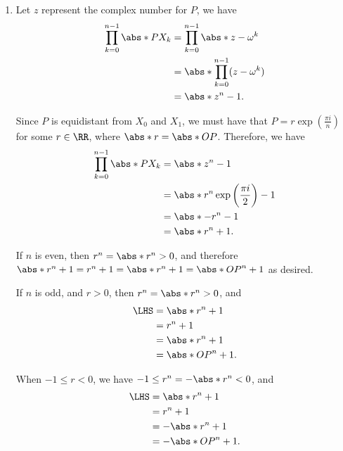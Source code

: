 \begin{enumerate}
    \item Let \(z\) represent the complex number for \(P\), we have
          \begin{align*}
              \prod_{k = 0}^{n - 1} \abs*{P X_k} & = \prod_{k = 0}^{n - 1} \abs*{z - \omega^k}   \\
                                                 & = \abs*{\prod_{k = 0}^{n - 1} (z - \omega^k)} \\
                                                 & = \abs*{z^n - 1}.
          \end{align*}

          Since \(P\) is equidistant from \(X_0\) and \(X_1\), we must have that \(P = r \exp\left(\frac{\pi i}{n}\right)\) for some \(r \in \RR\), where \(\abs*{r} = \abs*{OP}\). Therefore, we have
          \begin{align*}
              \prod_{k = 0}^{n - 1} \abs*{P X_k} & = \abs*{z^n - 1}                                  \\
                                                 & = \abs*{r^n \exp\left(\frac{\pi i}{2}\right) - 1} \\
                                                 & = \abs*{-r^n - 1}                                 \\
                                                 & = \abs*{r^n + 1}.
          \end{align*}

          If \(n\) is even, then \(r^n = \abs*{r}^n > 0\), and therefore \(\abs*{r^n + 1} = r^n + 1 = \abs*{r}^n + 1 = \abs*{OP}^n + 1\) as desired.

          If \(n\) is odd, and \(r > 0\), then \(r^n = \abs*{r}^n > 0\), and
          \begin{align*}
              \LHS & = \abs*{r^n + 1}   \\
                   & = r^n + 1          \\
                   & = \abs*{r}^n + 1   \\
                   & = \abs*{OP}^n + 1.
          \end{align*}

          When \(-1 \leq r < 0\), we have \(-1 \leq r^n = -\abs*{r}^n < 0\), and
          \begin{align*}
              \LHS & = \abs*{r^n + 1}    \\
                   & = r^n + 1           \\
                   & = -\abs*{r}^n + 1   \\
                   & = -\abs*{OP}^n + 1.
          \end{align*}


\end{enumerate}
